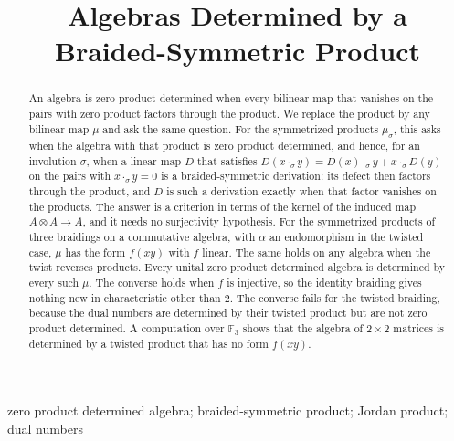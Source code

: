\documentclass[]{interact}
\theoremstyle{plain}
\theoremstyle{definition}
\theoremstyle{remark}
\newcommand{\paperversion}{10}
\begin{document}
\title{Algebras Determined by a Braided-Symmetric Product}

\author{
}

\history{Preprint version \paperversion, compiled \today}

\maketitle

\begin{abstract}
An algebra is zero product determined when every bilinear map that vanishes on the pairs with zero product factors through the product.
We replace the product by any bilinear map $\mu$ and ask the same question.
For the symmetrized products $\mu_\sigma$, this asks when the algebra with that product is zero product determined, and hence, for an involution $\sigma$, when a linear map $D$ that satisfies $D(x \cdot_\sigma y) = D(x) \cdot_\sigma y + x \cdot_\sigma D(y)$ on the pairs with $x \cdot_\sigma y = 0$ is a braided-symmetric derivation: its defect then factors through the product, and $D$ is such a derivation exactly when that factor vanishes on the products.
The answer is a criterion in terms of the kernel of the induced map $A \otimes A \to A$, and it needs no surjectivity hypothesis.
For the symmetrized products of three braidings on a commutative algebra, with $\alpha$ an endomorphism in the twisted case, $\mu$ has the form $f(xy)$ with $f$ linear.
The same holds on any algebra when the twist reverses products.
Every unital zero product determined algebra is determined by every such $\mu$.
The converse holds when $f$ is injective, so the identity braiding gives nothing new in characteristic other than $2$.
The converse fails for the twisted braiding, because the dual numbers are determined by their twisted product but are not zero product determined.
A computation over $\mathbb{F}_3$ shows that the algebra of $2 \times 2$ matrices is determined by a twisted product that has no form $f(xy)$.
\end{abstract}

\begin{keywords}
zero product determined algebra; braided-symmetric product; Jordan product; dual numbers
\end{keywords}
\end{document}
